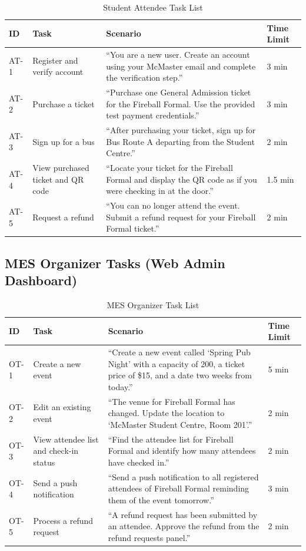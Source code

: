 \documentclass[12pt, titlepage]{article}
\begin{document}
\begin{table}[H]
\centering
\caption{Student Attendee Task List}
\begin{tabularx}{\textwidth}{p{1cm}p{4.5cm}Xp{2.5cm}}
\toprule
\textbf{ID} & \textbf{Task} & \textbf{Scenario} & \textbf{Time Limit} \\
\midrule
AT-1 & Register and verify account &
``You are a new user. Create an account using your McMaster email and complete the verification step.'' &
3 min \\
\midrule
AT-2 & Purchase a ticket &
``Purchase one General Admission ticket for the Fireball Formal. Use the provided test payment credentials.'' &
3 min \\
\midrule
AT-3 & Sign up for a bus &
``After purchasing your ticket, sign up for Bus Route A departing from the Student Centre.'' &
2 min \\
\midrule
AT-4 & View purchased ticket and QR code &
``Locate your ticket for the Fireball Formal and display the QR code as if you were checking in at the door.'' &
1.5 min \\
\midrule
AT-5 & Request a refund &
``You can no longer attend the event. Submit a refund request for your Fireball Formal ticket.'' &
2 min \\
\bottomrule
\end{tabularx}
\end{table}


\subsection{MES Organizer Tasks (Web Admin Dashboard)}


\begin{table}[H]
\centering
\caption{MES Organizer Task List}
\begin{tabularx}{\textwidth}{p{1cm}p{4.5cm}Xp{2.5cm}}
\toprule
\textbf{ID} & \textbf{Task} & \textbf{Scenario} & \textbf{Time Limit} \\
\midrule
OT-1 & Create a new event &
``Create a new event called `Spring Pub Night' with a capacity of 200, a ticket price of \$15, and a date two weeks from today.'' &
5 min \\
\midrule
OT-2 & Edit an existing event &
``The venue for Fireball Formal has changed. Update the location to `McMaster Student Centre, Room 201'.'' &
2 min \\
\midrule
OT-3 & View attendee list and check-in status &
``Find the attendee list for Fireball Formal and identify how many attendees have checked in.'' &
2 min \\
\midrule
OT-4 & Send a push notification &
``Send a push notification to all registered attendees of Fireball Formal reminding them of the event tomorrow.'' &
3 min \\
\midrule
OT-5 & Process a refund request &
``A refund request has been submitted by an attendee. Approve the refund from the refund requests panel.'' &
2 min \\
\bottomrule
\end{tabularx}
\end{table}
\end{document}
